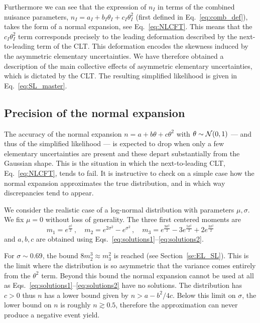 \documentclass[11pt]{article}
\newcommand{\be}{\begin{equation}}
\newcommand{\ee}{\end{equation}}
\begin{document}
Furthermore we can see that the expression of $n_I$ in terms of the combined nuisance parameters, $n_I=a_I+b_{I}\theta_I+ c_I\theta_I^2$ (first defined in Eq.~\eqref{eq:comb_def}), takes the form of a normal expansion, see Eq.~\eqref{eq:NLCFT}. 
This means that the $c_I \theta_I^2$ term  corresponds  precisely to the leading deformation  described by the next-to-leading term of the CLT.  This deformation encodes the skewness induced by the asymmetric elementary uncertainties. We have therefore obtained  a  description of the main collective effects of asymmetric elementary uncertainties, which is dictated by  the CLT. The resulting  simplified likelihood is given in Eq.~\eqref{eq:SL_master}.



\subsection{Precision of the normal expansion}
\label{se:precision}

The accuracy of the normal expansion $n =  a+ b \theta+ c \theta^2$ with $\theta\sim {\cal N}(0,1)$ --- and thus of the  simplified likelihood --- is expected to drop when only a few elementary  uncertainties are present and these depart substantially from the Gaussian shape. 
This is the situation in which the next-to-leading CLT, Eq.~\eqref{eq:NLCFT}, tends to fail.  It is instructive to check  on a simple case how the normal expansion approximates the true distribution, and in which way discrepancies tend to appear.

We consider the realistic  case of a log-normal distribution with parameters $\mu, \sigma$. We fix $\mu=0$ without loss of generality. The three first centered moments are
\be
m_1=e^{\frac{\sigma^2}{2}}\,,\quad m_2=e^{2\sigma^2}-e^{\sigma^2}\,,\quad
m_3=e^{\frac{9\sigma^2}{2}}-3 e^{\frac{5\sigma^2}{2}}+2 e^{\frac{3\sigma^2}{2}}
\ee
and  $a,b,c$ are obtained  using  Eqs.~\eqref{eq:solutions1}--\eqref{eq:solutions2}.

For $\sigma\sim 0.69$, the bound $8m_2^3\approx m_3^2$  is reached (see Section~\ref{se:EL_SL}). This is the limit where
the distribution is so asymmetric that the variance comes entirely from the $\theta^2$ term. Beyond this bound the  normal expansion cannot be used at all as Eqs.~\eqref{eq:solutions1}--\eqref{eq:solutions2} have no solutions.
The distribution has $c>0$ thus $n$ has a lower bound given by $n>a-b^2/4c$. 
Below this limit on $\sigma$, the lower bound on $n$ is roughly $n\gtrsim 0.5$, therefore the approximation can never produce a negative event yield.
\end{document}
